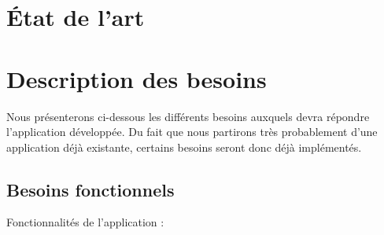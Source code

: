 \documentclass[french]{article}
\begin{document}
\section{État de l'art}

\section{Description des besoins}

Nous présenterons ci-dessous les différents besoins auxquels devra répondre l'application développée. Du fait que nous partirons très probablement d'une application déjà existante, certains besoins seront donc déjà implémentés.

\newpage
\subsection{Besoins fonctionnels}
Fonctionnalités de l'application :
\end{document}
